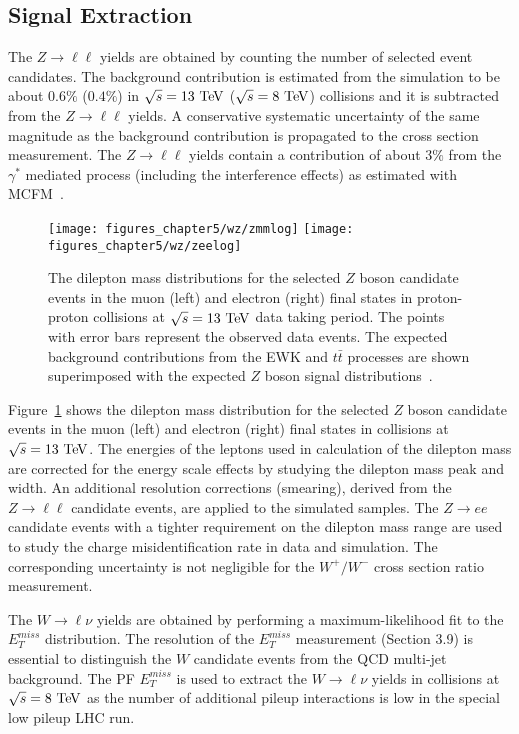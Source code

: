 \subsection{Signal Extraction}

The $Z\rightarrow \ell\ell$ yields are obtained by counting the number of selected event candidates. The background contribution is estimated from the simulation to be about $0.6\%$ ($0.4\%$) in $\sqrt{s}=13~\mathrm{Te\kern -0.1em V}$ ($\sqrt{s}=8~\mathrm{Te\kern -0.1em V}$) collisions and it is subtracted from the $Z\rightarrow \ell\ell$ yields. A conservative systematic uncertainty of the same magnitude as the background contribution is propagated to the cross section measurement. The $Z\rightarrow \ell\ell$ yields contain a contribution of about $3\%$ from the $\gamma^{*}$ mediated process (including the interference effects) as estimated with MCFM~\cite{Campbell:2010ff}. 
\begin{figure}[htbp]
\centering
\texttt{[image: figures\_chapter5/wz/zmmlog]}
\texttt{[image: figures\_chapter5/wz/zeelog]}
\caption{The dilepton mass distributions for the selected $Z$ boson candidate events in the muon (left) and electron (right) final states in proton-proton collisions at $\sqrt{s}=13~\mathrm{Te\kern -0.1em V}$ data taking period. The points with error bars represent the observed data events. The expected background contributions from the EWK and $t\bar{t}$ processes are shown superimposed with the expected $Z$ boson signal distributions~\cite{CMS-PAS-SMP-15-004}. 
\label{fig:z13}}
\end{figure}
Figure~\ref{fig:z13} shows the dilepton mass distribution for the selected $Z$ boson candidate events in the muon (left) and electron (right) final states in collisions at $\sqrt{s}=13~\mathrm{Te\kern -0.1em V}$. The energies of the leptons used in calculation of the dilepton mass are corrected for the energy scale effects by studying the dilepton mass peak and width. An additional resolution corrections (smearing), derived from the $Z \rightarrow \ell\ell$ candidate events, are applied to the simulated samples. The  $Z \rightarrow ee$ candidate events with a tighter requirement on the dilepton mass range are used to study the charge misidentification rate in data and simulation. The corresponding uncertainty is not negligible for the $W^+/W^-$ cross section ratio measurement.      
 
 The $W \rightarrow \ell \nu$ yields are obtained by performing a maximum-likelihood fit to the $E_{T}^{miss}$ distribution. The resolution of the $E_{T}^{miss}$ measurement (Section 3.9) is essential to distinguish the $W$ candidate events from the QCD multi-jet background. The PF $E_{T}^{miss}$ is used to extract the $W \rightarrow \ell \nu$ yields in collisions at $\sqrt{s}=8~\mathrm{Te\kern -0.1em V}$ as the number of additional pileup interactions is low in the special low pileup LHC run. 
 
